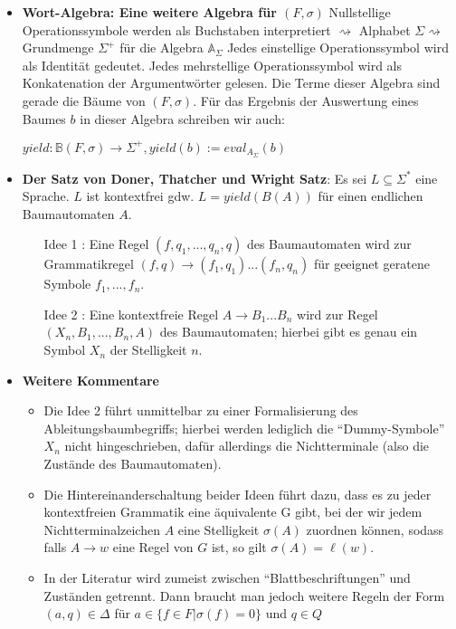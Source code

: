 \documentclass[12pt, a4paper]{article}
\begin{document}
\begin{itemize}
		\item \textbf{Wort-Algebra: Eine weitere Algebra für $(F,\sigma)$}
			\subitem Nullstellige Operationssymbole werden als Buchstaben interpretiert
			\subitem$\rightsquigarrow$ Alphabet $\Sigma\rightsquigarrow$ Grundmenge $\Sigma^{+}$ für die Algebra $\mathbb{A}_{\Sigma}$
			\subitem Jedes einstellige Operationssymbol wird als Identität gedeutet.
			\subitem Jedes mehrstellige Operationssymbol wird als Konkatenation der Argumentwörter gelesen.
			\subitem Die Terme dieser Algebra sind gerade die Bäume von $(F,\sigma)$.
			\subitem Für das Ergebnis der Auswertung eines Baumes $b$ in dieser Algebra schreiben wir auch:
			\begin{center}
				$yield:\mathbb{B}(F,\sigma)\rightarrow\Sigma^{+}, yield(b) := eval_{A_{\Sigma}}(b)$
			\end{center}
		
		\item \textbf{Der Satz von Doner, Thatcher und Wright}
			\subitem \textbf{Satz}: Es sei $L\subseteq\Sigma^{*}$ eine Sprache.
			\subitem $L$ ist kontextfrei gdw. $L=yield(B(A))$ für einen endlichen Baumautomaten $A$.
			\begin{itemize}
				\item[Idee 1]: Eine Regel $(f,q_{1},...,q_{n},q)$ des Baumautomaten wird zur Grammatikregel $(f,q)\rightarrow(f_{1},q_{1})...(f_{n},q_{n})$ für geeignet geratene Symbole $f_{1},...,f_{n}$.
				\item[Idee 2]: Eine kontextfreie Regel $A\rightarrow B_{1}...B_{n}$ wird zur Regel $(X_{n},B_{1},...,B_{n},A)$ des Baumautomaten; hierbei gibt es genau ein Symbol $X_{n}$ der Stelligkeit $n$.
			\end{itemize}
		
		
		\item \textbf{Weitere Kommentare}
			\begin{itemize}
				\item Die Idee 2 führt unmittelbar zu einer Formalisierung des Ableitungsbaumbegriffs; hierbei werden lediglich die “Dummy-Symbole” $X_{n}$ nicht hingeschrieben, dafür allerdings die Nichtterminale (also die Zustände des Baumautomaten).
				\item Die Hintereinanderschaltung beider Ideen führt dazu, dass es zu jeder kontextfreien Grammatik eine äquivalente G gibt, bei der wir jedem Nichtterminalzeichen $A$ eine Stelligkeit $\sigma(A)$ zuordnen können, sodass falls $A\rightarrow w$ eine Regel von $G$ ist, so gilt $\sigma(A)=\ell(w)$.
				\item In der Literatur wird zumeist zwischen “Blattbeschriftungen” und Zuständen getrennt. Dann braucht man jedoch weitere Regeln der Form $(a,q)\in\Delta$ für $a\in\{f\in F|\sigma(f)=0\}$ und $q\in Q$
			\end{itemize}
		

\end{itemize}
\end{document}
